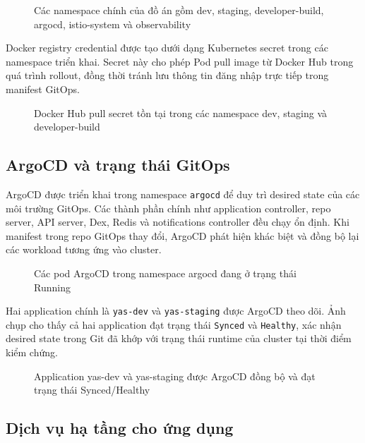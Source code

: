 \begin{figure}[H]
\centering
{}
\caption{Các namespace chính của đồ án gồm dev, staging, developer-build, argocd, istio-system và observability}
\end{figure}

Docker registry credential được tạo dưới dạng Kubernetes secret trong các namespace triển khai. Secret này cho phép Pod pull image từ Docker Hub trong quá trình rollout, đồng thời tránh lưu thông tin đăng nhập trực tiếp trong manifest GitOps.

\begin{figure}[H]
\centering
{}
\caption{Docker Hub pull secret tồn tại trong các namespace dev, staging và developer-build}
\end{figure}

\subsection{ArgoCD và trạng thái GitOps}

ArgoCD được triển khai trong namespace \texttt{argocd} để duy trì desired state của các môi trường GitOps. Các thành phần chính như application controller, repo server, API server, Dex, Redis và notifications controller đều chạy ổn định. Khi manifest trong repo GitOps thay đổi, ArgoCD phát hiện khác biệt và đồng bộ lại các workload tương ứng vào cluster.

\begin{figure}[H]
\centering
{}
\caption{Các pod ArgoCD trong namespace argocd đang ở trạng thái Running}
\end{figure}

Hai application chính là \texttt{yas-dev} và \texttt{yas-staging} được ArgoCD theo dõi. Ảnh chụp cho thấy cả hai application đạt trạng thái \texttt{Synced} và \texttt{Healthy}, xác nhận desired state trong Git đã khớp với trạng thái runtime của cluster tại thời điểm kiểm chứng.

\begin{figure}[H]
\centering
{}
\caption{Application yas-dev và yas-staging được ArgoCD đồng bộ và đạt trạng thái Synced/Healthy}
\end{figure}

\subsection{Dịch vụ hạ tầng cho ứng dụng}

